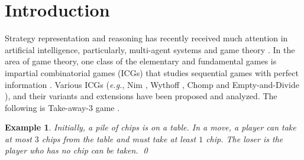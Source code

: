 \documentclass[review]{elsarticle}
\newcommand\eg{{\it e.g.}}
\newtheorem{example}{Example}
\begin{document}

\section{Introduction}
	Strategy representation and reasoning has recently received much attention in artificial intelligence, particularly, multi-agent systems and game theory \cite{ChaHP2010,ZhangT2015,XiongL2016a}.
	In the area of game theory, one class of the elementary and fundamental games is impartial combinatorial games (ICGs) that studies sequential games with perfect information \cite{Fer2018}.
	Various ICGs (\eg, Nim \cite{Bou1901}, Wythoff \cite{Wyt1907}, Chomp \cite{Sch1952} and Empty-and-Divide \cite{Fer1998}), and their variants and extensions \cite{LiuZ2015,AhnCCEFGGKMPS2017} have been proposed and analyzed.
	The following is Take-away-$3$ game \cite{Gol1966}.
	
	\begin{example}	\label{exm:chomp} %
		Initially, a pile of chips is on a table.
		In a move, a player can take at most $3$ chips from the table and must take at least $1$ chip.
		The loser is the player who has no chip can be taken. \qed
	\end{example}	
		
\end{document}

